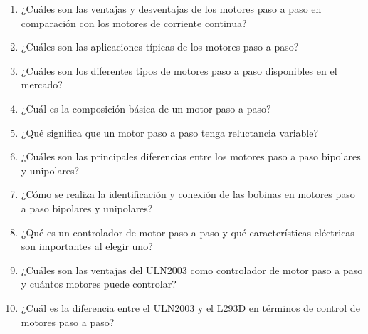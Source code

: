 \documentclass[../main]{subfiles}
\begin{document}
\begin{enumerate}
  \item ¿Cuáles son las ventajas y desventajas de los motores paso a
    paso en comparación con los motores de corriente continua?
  \item ¿Cuáles son las aplicaciones típicas de los motores paso a paso?
  \item ¿Cuáles son los diferentes tipos de motores paso a paso
    disponibles en el mercado?
  \item ¿Cuál es la composición básica de un motor paso a paso?
  \item ¿Qué significa que un motor paso a paso tenga reluctancia variable?
  \item ¿Cuáles son las principales diferencias entre los motores
    paso a paso bipolares y unipolares?
  \item ¿Cómo se realiza la identificación y conexión de las bobinas
    en motores paso a paso bipolares y unipolares?
  \item ¿Qué es un controlador de motor paso a paso y qué
    características eléctricas son importantes al elegir uno?
  \item ¿Cuáles son las ventajas del ULN2003 como controlador de
    motor paso a paso y cuántos motores puede controlar?
  \item ¿Cuál es la diferencia entre el ULN2003 y el L293D en
    términos de control de motores paso a paso?

\end{enumerate}
\end{document}
